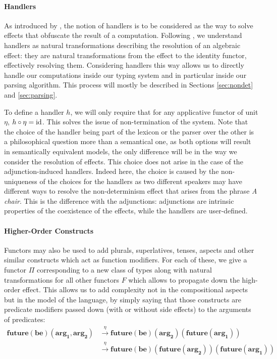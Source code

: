 \paragraph{Handlers}
\label{par:handlers}
As introduced by \cite{marsikAlgebraicEffectsHandlers}, the notion of handlers
is to be considered as the way to solve effects that obfuscate the result of a
computation.
Following \cite{wuEffectHandlersScope2014}, we understand handlers as natural
transformations describing the resolution of an algebraic effect: they are
natural transformations from the effect to the identity functor, effectively
resolving them.
Considering handlers this way allows us to directly handle our computations
inside our typing system and in particular inside our parsing algorithm.
This process will mostly be described in Sections \ref{sec:nondet} and
\ref{sec:parsing}.

\smallskip

To define a handler $h$, we will only require that for any applicative functor
of unit $\eta$, $h\circ \eta = \mathrm{id}$.
This solves the issue of non-termination of the system.
Note that the choice of the handler being part of the lexicon or the parser
over the other is a philosophical question more than a semantical one, as both
options will result in semantically equivalent models, the only difference will
be in the way we consider the resolution of effects.
This choice does not arise in the case of the adjunction-induced
handlers.
Indeed here, the choice is caused by the non-uniqueness of the choices for
the handlers as two different speakers may have different ways to resolve the
non-determinism effect that arises from the phrase \textsl{A chair}.
This is the difference with the adjunctions: adjunctions are intrinsic
properties of the coexistence of the effects, while the handlers
are user-defined.

\paragraph{Higher-Order Constructs}
\label{par:higherorder}
Functors may also be used to add plurals, superlatives, tenses, aspects and
other similar constructs which act as function modifiers.
For each of these, we give a functor $\Pi$ corresponding to a new class of
types along with natural transformations for all other functors $F$ which
allows to propagate down the high-order effect.
This allows us to add complexity not in the compositional aspects but
in the model of the language, by simply saying that those constructs are
predicate modifiers passed down (with or without side effects) to the arguments
of predicates:
\begin{equation*}
	\begin{aligned}
		\mathbf{future\left( be \right)\left( arg_{1}, arg_{2} \right)}
		 & \xrightarrow{\eta} \mathbf{future\left( be \right)\left( arg_{2} \right)\left( future\left( arg_{1} \right) \right)}                           \\
		 & \xrightarrow{\eta} \mathbf{future \left( be \right) \left( future \left( arg_{2} \right) \right) \left( future \left( arg_{1} \right) \right)}
	\end{aligned}
\end{equation*}

